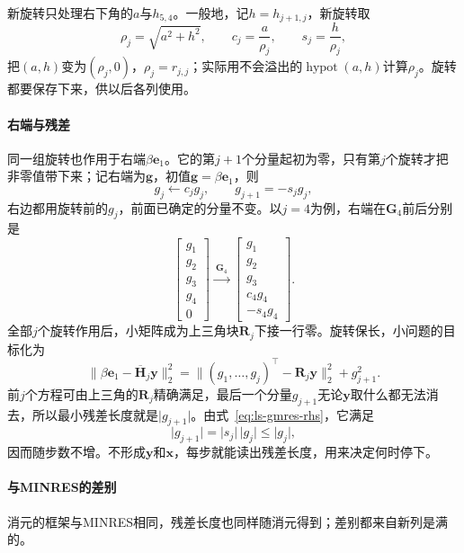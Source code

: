 新旋转只处理右下角的$a$与$h_{5,4}$。一般地，记$h=h_{j+1,j}$，新旋转取
\begin{equation}
 \rho_j=\sqrt{a^2+h^2},\qquad c_j=\frac a{\rho_j},\qquad s_j=\frac h{\rho_j},
 \label{eq:ls-gmres-givens}
\end{equation}
把$(a,h)$变为$(\rho_j,0)$，$\rho_j=r_{j,j}$；实际用不会溢出的$\operatorname{hypot}(a,h)$计算$\rho_j$。旋转都要保存下来，供以后各列使用。

\paragraph{右端与残差}
同一组旋转也作用于右端$\beta\bm e_1$。它的第$j+1$个分量起初为零，只有第$j$个旋转才把非零值带下来；记右端为$\bm g$，初值$\bm g=\beta\bm e_1$，则
\begin{equation}
 g_j\leftarrow c_jg_j,\qquad g_{j+1}=-s_jg_j ,
 \label{eq:ls-gmres-rhs}
\end{equation}
右边都用旋转前的$g_j$，前面已确定的分量不变。以$j=4$为例，右端在$\bm G_4$前后分别是
\[
 \begin{bmatrix}g_1\\g_2\\g_3\\g_4\\0\end{bmatrix}
 \xrightarrow{\ \bm G_4\ }
 \begin{bmatrix}g_1\\g_2\\g_3\\c_4g_4\\-s_4g_4\end{bmatrix}.
\]
全部$j$个旋转作用后，小矩阵成为上三角块$\bm R_j$下接一行零。旋转保长，小问题的目标化为
\begin{equation}
 \lVert\beta\bm e_1-\overline{\bm H}_j\bm y\rVert_2^2
 =\lVert(g_1,\ldots,g_j)^\top-\bm R_j\bm y\rVert_2^2+g_{j+1}^2 .
 \label{eq:ls-gmres-rotated-objective}
\end{equation}
前$j$个方程可由上三角的$\bm R_j$精确满足，最后一个分量$g_{j+1}$无论$\bm y$取什么都无法消去，所以最小残差长度就是$\lvert g_{j+1}\rvert$。由式~\eqref{eq:ls-gmres-rhs}，它满足
\[
 \lvert g_{j+1}\rvert=\lvert s_j\rvert\,\lvert g_j\rvert\le\lvert g_j\rvert ,
\]
因而随步数不增。不形成$\bm y$和$\bm x$，每步就能读出残差长度，用来决定何时停下。

\paragraph{与MINRES的差别}
消元的框架与MINRES相同，残差长度也同样随消元得到；差别都来自新列是满的。


